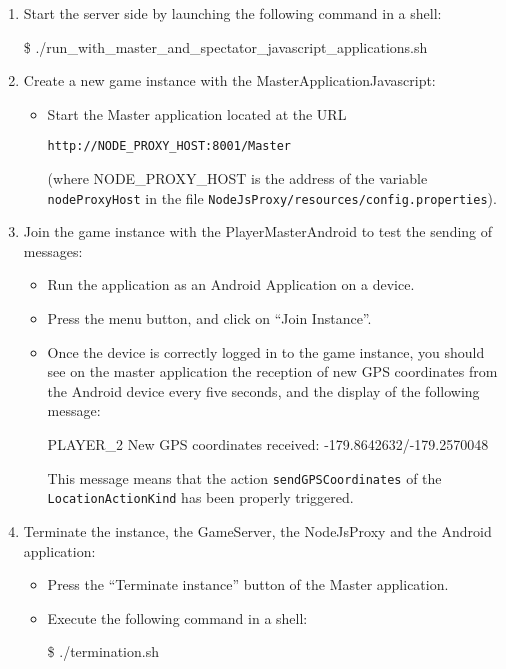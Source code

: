 \begin{enumerate}
\begin{enumerate}
\begin{itemize}
\begin{shellcmd}
    \}
\}
\end{shellcmd}
\end{itemize}
\item Start the server side by launching the following command in a shell:
\begin{shellcmd}
\$ ./run_with_master_and_spectator_javascript_applications.sh
\end{shellcmd}
\item Create a new game instance with the MasterApplicationJavascript:
\begin{itemize}
\item Start the Master application located at the
  URL \begin{small}\texttt{http://NODE\_PROXY\_HOST:8001/Master}\end{small}
  (where NODE\_PROXY\_HOST is the address of the variable
  \texttt{nodeProxyHost} in the file
  \texttt{NodeJsProxy/resources/config.properties}).
\end{itemize}
\item Join the game instance with the PlayerMasterAndroid to test the sending of
messages:
\begin{itemize}
\item Run the application as an Android Application on a device.
\item Press the menu button, and click on ``Join Instance''.
\item Once the device is correctly logged in to the game instance, you
  should see on the master application the reception of new GPS
  coordinates from the Android device every five seconds, and the
  display of the following message:
\begin{shellcmd}
PLAYER\_2	New GPS coordinates received: -179.8642632/-179.2570048
\end{shellcmd}
This message means that the action \texttt{sendGPSCoordinates} of the 
\texttt{LocationActionKind} has been properly triggered.
\end{itemize}
\item Terminate the instance, the GameServer, the NodeJsProxy and the Android 
application:
\begin{itemize}
\item Press the ``Terminate instance'' button of the Master application.
\item Execute the following command in a shell:
  \begin{shellcmd}  
\$ ./termination.sh
\end{shellcmd}
\end{itemize}
\end{enumerate}

\end{enumerate}

\endinput
